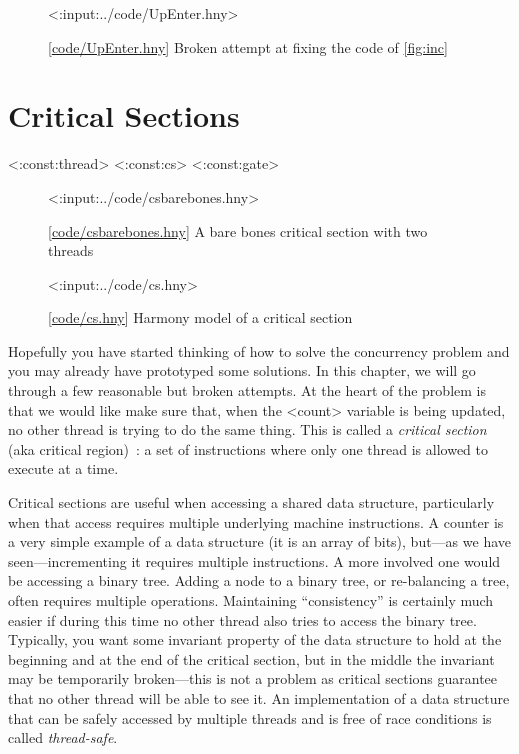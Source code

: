 \documentclass{report}
\newcommand{\harmonylink}[1]{%
[\href{https://harmony.cs.cornell.edu/#1}{\underline{#1}}]%
}
\newenvironment{code}{
\tcolorbox
}{
\endtcolorbox
}
\begin{document}
\begin{figure}
\begin{code}
<{:input:../code/UpEnter.hny}>
\end{code}
\caption{\harmonylink{code/UpEnter.hny} Broken attempt at fixing the code of \autoref{fig:inc}}
\label{fig:incenter}
\end{figure}

\chapter{Critical Sections}
\label{ch:critical}

<{:const:thread}>
<{:const:cs}>
<{:const:gate}>

\begin{figure}
\begin{code}
<{:input:../code/csbarebones.hny}>
\end{code}
\caption{\harmonylink{code/csbarebones.hny} A bare bones critical section with two threads}
\label{fig:csbarebones}
\end{figure}

\begin{figure}
\begin{code}
<{:input:../code/cs.hny}>
\end{code}
\caption{\harmonylink{code/cs.hny} Harmony model of a critical section}
\label{fig:cs}
\end{figure}

Hopefully you have started thinking of how to solve the concurrency
problem and you may already have prototyped some solutions.
In this chapter, we will go through a few reasonable but broken attempts.
At the heart of the problem is that we would like make sure that, when
the <{count}> variable is being updated, no other thread is
trying to do the same thing.  This is called a \emph{critical section}
(aka critical region)~\cite{EWD123}:
a set of instructions where only one thread is allowed to execute at a
time.
%
%

%
%

Critical sections are useful when accessing a shared data
structure, particularly when that access requires multiple underlying
machine instructions.  A counter is a very simple example of
a data structure (it is an array of bits), but---as we have
seen---incrementing it requires multiple instructions.
A more involved one would be accessing a binary tree.
Adding a node to a binary tree, or re-balancing a tree, often requires
multiple operations.  Maintaining ``consistency'' is certainly much easier
if during this time no other
thread also tries to access the binary tree.
Typically, you want some invariant property of the data structure to hold
at the beginning and at the end of the critical section, but in the middle
the invariant may be temporarily broken---this is not a problem as critical
sections guarantee that no other
thread will be able to see it.
An implementation of a data structure that can be safely accessed by multiple
threads and is free of race conditions is called \emph{thread-safe}.
%
%
\end{document}
